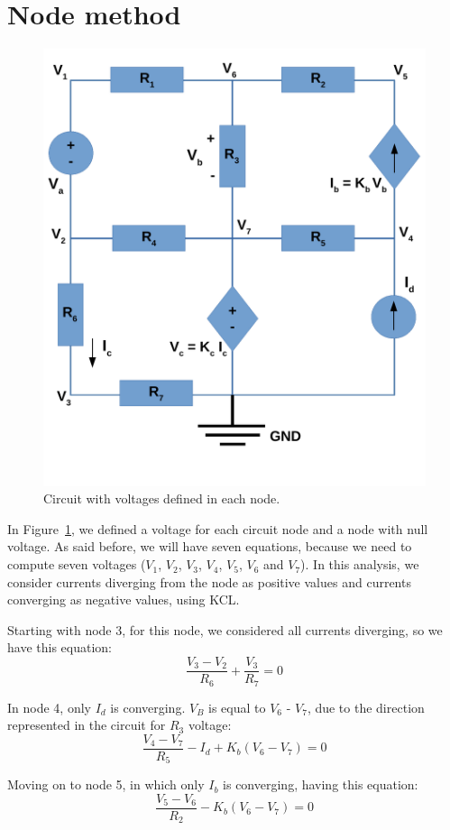 \newpage
\section{Node method}
\begin{figure}[h] \centering
\includegraphics[width=0.6\linewidth]{Circuit_Nodes.pdf}
\caption{Circuit with voltages defined in each node.}
\label{fig:Circuit_Nodes}
\end{figure}
\noindent In Figure~\ref{fig:Circuit_Nodes}, we defined a voltage for each circuit node and a node with null voltage.
As said before, we will have seven equations, because we need to compute seven voltages 
($V_1$, $V_2$, $V_3$, $V_4$, $V_5$, $V_6$ and $V_7$).
In this analysis, we consider currents diverging from the node as positive values and currents converging as negative values, using KCL.

\noindent Starting with node 3, for this node, we considered all currents diverging, so we have this equation:
\begin{equation}
\frac{V_3 - V_2}{R_6} + \frac{V_3}{R_7} = 0
  \label{eq:kvl_node3}
\end{equation}

\noindent In node 4, only $I_d$ is converging.
$V_B$ is equal to $V_6$ - $V_7$, due to the direction represented in the circuit for $R_3$ voltage:
\begin{equation}
\frac{V_4 - V_7}{R_5} - I_d + K_b(V_6 - V_7) = 0
  \label{eq:kvl_node4}
\end{equation}

\noindent Moving on to node 5, in which only $I_b$ is converging, having this equation:
\begin{equation}
\frac{V_5 - V_6}{R_2} - K_b(V_6 - V_7) = 0
  \label{eq:kvl_node5}
\end{equation}

